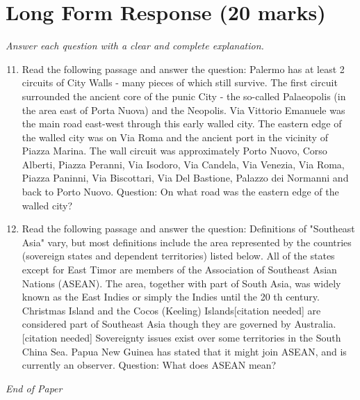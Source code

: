 \documentclass[12pt]{article}
\begin{document}
\section*{Long Form Response (20 marks)}
\textit{Answer each question with a clear and complete explanation.}
\begin{enumerate}[label=\arabic*.]
\setcounter{enumi}{10}
\item Read the following passage and answer the question: Palermo has at least 2 circuits of City Walls - many pieces of which still survive. The first circuit surrounded the ancient core of the punic City - the so-called Palaeopolis (in the area east of Porta Nuova) and the Neopolis. Via Vittorio Emanuele was the main road east-west through this early walled city. The eastern edge of the walled city was on Via Roma and the ancient port in the vicinity of Piazza Marina. The wall circuit was approximately Porto Nuovo, Corso Alberti, Piazza Peranni, Via Isodoro, Via Candela, Via Venezia, Via Roma, Piazza Paninni, Via Biscottari, Via Del Bastione, Palazzo dei Normanni and back to Porto Nuovo. Question: On what road was the eastern edge of the walled city?
\item Read the following passage and answer the question: Definitions of "Southeast Asia" vary, but most definitions include the area represented by the countries (sovereign states and dependent territories) listed below. All of the states except for East Timor are members of the Association of Southeast Asian Nations (ASEAN). The area, together with part of South Asia, was widely known as the East Indies or simply the Indies until the 20 th century. Christmas Island and the Cocos (Keeling) Islands[citation needed] are considered part of Southeast Asia though they are governed by Australia.[citation needed] Sovereignty issues exist over some territories in the South China Sea. Papua New Guinea has stated that it might join ASEAN, and is currently an observer. Question: What does ASEAN mean?
\end{enumerate}

\vfill
\noindent\textit{End of Paper}
\end{document}
